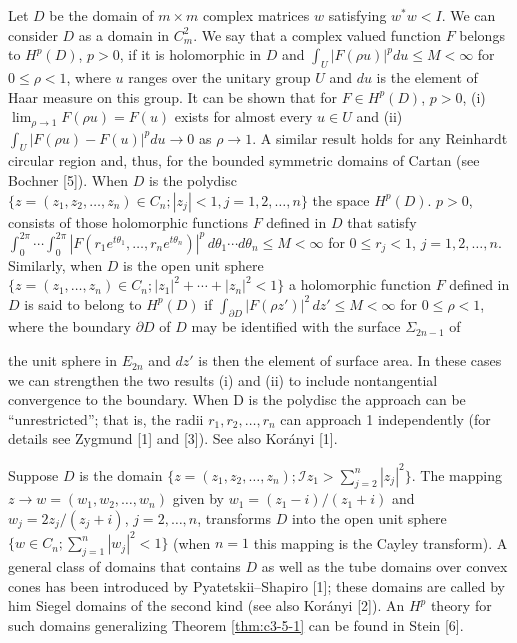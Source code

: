  Let $D$ be the domain of $m \times m$ complex matrices $w$ satisfying $w^*w < I$. We can consider $D$ as a domain in $C_m^2$. We say that a complex valued function $F$ belongs to $H^p(D)$, $p > 0$, if it is holomorphic in $D$ and $\int_U |F(\rho u)|^p du \leq M < \infty$ for $0 \leq \rho < 1$, where $u$ ranges over the unitary group $U$ and $du$ is the element of Haar measure on this group. It can be shown that for $F \in H^p(D)$, $p > 0$, (i) $\lim_{\rho \to 1} F(\rho u) = F(u)$ exists for almost every $u \in U$ and (ii) $\int_U |F(\rho u) - F(u)|^p du \to 0$ as $\rho \to 1$. A similar result holds for any Reinhardt circular region and, thus, for the bounded symmetric domains of Cartan (see Bochner [5]). When $D$ is the polydisc $\{z = (z_1, z_2, \ldots, z_n) \in C_n; |z_j| < 1, j = 1, 2, \ldots, n\}$ the space $H^p(D)$. $p > 0$, consists of those holomorphic functions $F$ defined in $D$ that satisfy $\int_0^{2\pi} \cdots \int_0^{2\pi} |F(r_1 e^{t\theta_1}, \ldots, r_n e^{t\theta_n})|^p \, d\theta_1 \cdots d\theta_n \leq M < \infty$ for $0 \leq r_j < 1$, $j = 1, 2, \ldots, n$. Similarly, when $D$ is the open unit sphere $\{z = (z_1, \ldots, z_n) \in C_n; |z_1|^2 + \cdots + |z_n|^2 < 1\}$ a holomorphic function $F$ defined in $D$ is said to belong to $H^p(D)$ if $\int_{\partial D} |F(\rho z')|^2 \, dz' \leq M < \infty$ for $0 \leq \rho < 1$, where the boundary $\partial D$ of $D$ may be identified with the surface $\Sigma_{2n-1}$ of

the unit sphere in $E_{2n}$ and $dz'$ is then the element of surface area. In these cases we can strengthen the two results (i) and (ii) to include nontangential convergence to the boundary. When D is the polydisc the approach can be ``unrestricted''; that is, the radii $r_1, r_2, \ldots, r_n$ can approach 1 independently (for details see Zygmund [1] and [3]). See also Korányi [1].

 Suppose $D$ is the domain $\{z = (z_1, z_2, \ldots, z_n); \mathcal{I}z_1 > \sum_{j=2}^{n} |z_j|^2\}$. The mapping $z \to w = (w_1, w_2, \ldots, w_n)$ given by $w_1 = (z_1 - i)/(z_1 + i)$ and $w_j = 2z_j/(z_j + i)$, $j = 2, \ldots, n$, transforms $D$ into the open unit sphere $\{w \in C_n; \sum_{j=1}^{n} |w_j|^2 < 1\}$ (when $n = 1$ this mapping is the Cayley transform). A general class of domains that contains $D$ as well as the tube domains over convex cones has been introduced by Pyatetskii--Shapiro [1]; these domains are called by him Siegel domains of the second kind (see also Korányi [2]). An $H^p$ theory for such domains generalizing Theorem \ref{thm:c3-5-1} can be found in Stein [6].

